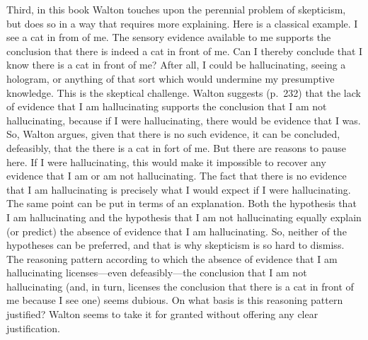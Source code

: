 \documentclass[12pt]{article}
\begin{document}
Third, in this book Walton touches upon the 
perennial problem of skepticism, but does so in a way that requires 
more explaining. Here is a classical example. 
I see a cat in from of me. The sensory evidence available to me supports 
the conclusion that there is indeed a cat in front of me. 
Can I thereby conclude that I know there is a cat in front of me?
After all, I could be hallucinating, seeing a hologram, or anything of 
that sort which would undermine my presumptive knowledge. This is the skeptical challenge.
Walton suggests (p.\ 232) that the lack of evidence that I am hallucinating supports the conclusion
that I am not hallucinating, because if I were hallucinating, there would be
evidence that I was. So, Walton argues, given that there is no such
evidence, it can be concluded, defeasibly, that the 
there is a cat in fort of me.  
But there are reasons to pause here. If I were hallucinating, this would make 
it impossible to recover any evidence that I am or am not hallucinating. The fact that there is no
evidence that I am hallucinating is precisely what I would expect if I
were hallucinating. The same point can be put in terms of an explanation. 
Both the hypothesis that I am hallucinating and the hypothesis that I am not hallucinating 
equally explain (or predict) the absence of evidence that I am hallucinating.
So, neither of the hypotheses can be preferred, and that is why skepticism is so hard to dismiss.
The reasoning pattern according to which the absence of evidence that I am hallucinating 
licenses---even defeasibly---the conclusion that I am not hallucinating (and, in turn, licenses the conclusion that 
there is a cat in front of me because I see one) seems dubious. %
On what basis is this reasoning pattern justified?
Walton seems to take it for granted without 
offering any clear justification. %
\end{document}
